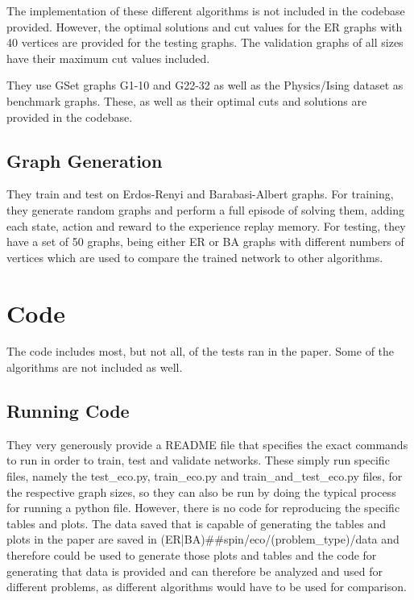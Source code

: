 \documentclass{article}
\begin{document}
The implementation of these different algorithms is not included in the codebase provided. However, the optimal solutions and cut values for the ER graphs with 40 vertices are provided for the testing graphs. The validation graphs of all sizes have their maximum cut values included.

They use GSet graphs G1-10 and G22-32 as well as the Physics/Ising dataset as benchmark graphs. These, as well as their optimal cuts and solutions are provided in the codebase. 

\subsection{Graph Generation}

They train and test on Erdos-Renyi \cite{erdos} and Barabasi-Albert \cite{albert} graphs. For training, they generate random graphs and perform a full episode of solving them, adding each state, action and reward to the experience replay memory. For testing, they have a set of 50 graphs, being either ER or BA graphs with different numbers of vertices which are used to compare the trained network to other algorithms. 

\section{Code}

The code includes most, but not all, of the tests ran in the paper. Some of the algorithms are not included as well.

\subsection{Running Code}

They very generously provide a README file that specifies the exact commands to run in order to train, test and validate networks. These simply run specific files, namely the test_eco.py, train_eco.py and train_and_test_eco.py files, for the respective graph sizes, so they can also be run by doing the typical process for running a python file. However, there is no code for reproducing the specific tables and plots. The data saved that is capable of generating the tables and plots in the paper are saved in (ER|BA)##spin/eco/(problem_type)/data and therefore could be used to generate those plots and tables and the code for generating that data is provided and can therefore be analyzed and used for different problems, as different algorithms would have to be used for comparison.
\end{document}
